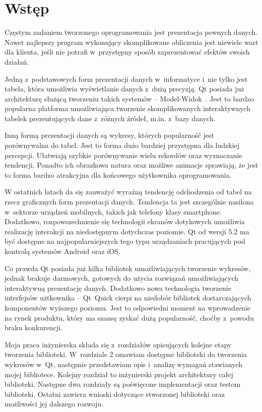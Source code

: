 \chapter*{Wstęp}
Częstym zadaniem tworzonego oprogramowania jest prezentacja pewnych danych. Nawet najlepszy program wykonujący skomplikowane obliczenia jest niewiele wart dla klienta, jeśli nie potrafi w~przystępny sposób zaprezentować efektów swoich działań.
 
Jedną z~podstawowych form prezentacji danych w~informatyce i~nie tylko jest tabela, która umożliwia wyświetlanie danych z~dużą precyzją. Qt posiada już architekturę służącą tworzeniu takich systemów -- Model-Widok~\cite{Qt:Model:View}. Jest to bardzo popularna platforma umożliwiająca tworzenie skomplikowanych interaktywnych tabelek prezentujących dane z~różnych źródeł, m.in. z~bazy danych.

Inną formą prezentacji danych są wykresy, których popularność jest porównywalna do tabel. Jest to forma dużo bardziej przystępna dla ludzkiej percepcji. Ułatwiają szybkie porównywanie wielu rekordów oraz wyznaczanie tendencji. Ponadto ich obrazkowa natura oraz możliwe animacje sprawiają, że jest to forma bardzo atrakcyjna dla końcowego użytkownika oprogramowania.

W ostatnich latach da się zauważyć wyraźną tendencję odchodzenia od tabel na rzecz graficznych form prezentacji danych. Tendencja ta jest szczególnie nasilona w~sektorze urządzeń mobilnych, takich jak telefony klasy smartphone. Dodatkowo, rozpowszechnienie się technologii ekranów dotykowych umożliwia realizację interakcji na niedostępnym dotychczas poziomie. Qt od wersji 5.2 ma być dostępne na najpopularniejszych tego typu urządzaniach pracujących pod kontrolą systemów Android oraz iOS. 

Co prawda Qt posiada już kilka bibliotek umożliwiających tworzenie wykresów, jednak brakuje darmowych, gotowych do użycia rozwiązań umożliwiających interaktywną prezentację danych. Dodatkowo nowa technologia tworzenie interfejsów użtkownika -- Qt~Quick cierpi na niedobór bibliotek dostarczających komponentów wyższego poziomu. Jest to odpowiedni moment na wprowadzenie na rynek produktu, który ma szansę zyskać dużą popularność, choćby z~powodu braku konkurencji.

Moja praca inżynierska składa się z~rozdziałów opisujących kolejne etapy tworzenia biblioteki. W~rozdziale 2 omawiam dostępne biblioteki do tworzenia wykresów w~Qt, następnie przedstawiam opis i~analizę wymagań stawianych mojej bibliotece. Kolejny rozdział to inżynierski projekt architektury całej biblioteki. Następne dwa rozdziały są poświęcone implementacji oraz testom biblioteki. Ostatni  zawiera wnioski dotyczące stworzonej biblioteki oraz możliwości jej dalszego rozwoju. 

